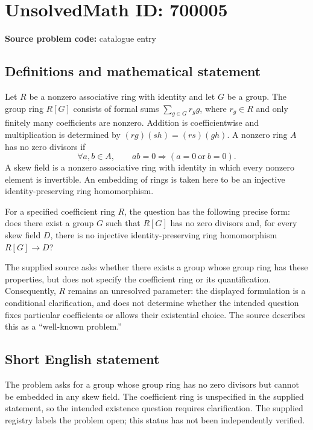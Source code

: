 \documentclass[11pt]{article}
\begin{document}
\section*{UnsolvedMath ID: 700005}
\textbf{Source problem code:} catalogue entry
\subsection{Definitions and mathematical statement}
Let \(R\) be a nonzero associative ring with identity and let \(G\) be a group. The group ring \(R[G]\) consists of formal sums \(\sum_{g\in G}r_g g\), where \(r_g\in R\) and only finitely many coefficients are nonzero. Addition is coefficientwise and multiplication is determined by \((rg)(sh)=(rs)(gh)\). A nonzero ring \(A\) has no zero divisors if
\[
\forall a,b\in A,\qquad ab=0\Longrightarrow(a=0\ \text{or}\ b=0).
\]
A skew field is a nonzero associative ring with identity in which every nonzero element is invertible. An embedding of rings is taken here to be an injective identity-preserving ring homomorphism.

For a specified coefficient ring \(R\), the question has the following precise form: does there exist a group \(G\) such that \(R[G]\) has no zero divisors and, for every skew field \(D\), there is no injective identity-preserving ring homomorphism \(R[G]\to D\)?

The supplied source asks whether there exists a group whose group ring has these properties, but does not specify the coefficient ring or its quantification. Consequently, \(R\) remains an unresolved parameter: the displayed formulation is a conditional clarification, and does not determine whether the intended question fixes particular coefficients or allows their existential choice. The source describes this as a ``well-known problem.''
\subsection{Short English statement}
The problem asks for a group whose group ring has no zero divisors but cannot be embedded in any skew field. The coefficient ring is unspecified in the supplied statement, so the intended existence question requires clarification. The supplied registry labels the problem open; this status has not been independently verified.
\end{document}
